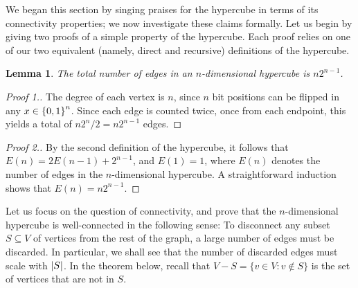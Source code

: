 \documentclass[11pt]{article}
\newcounter{thm}
\newtheorem{lemma}{Lemma}[thm]
\begin{document}
We began this section by singing praises for the hypercube in terms of its connectivity properties; we now investigate these claims formally. Let us begin by giving two proofs of a simple property of the hypercube. Each proof relies on one of our two equivalent (namely, direct and recursive) definitions of the hypercube.

\begin{lemma}
The total number of edges in an $n$-dimensional hypercube is $n 2^{n-1}$.
\end{lemma}
\begin{proof}[Proof 1.] The degree of each vertex is $n$, since $n$ bit positions can be flipped in any $x\in{\left\{0,1\right\}}^n$. Since each edge is counted twice, once from each endpoint, this yields a total of $n 2^n /2 = n2^{n-1}$ edges.
\end{proof}
\begin{proof}[Proof 2.]
By the second definition of the hypercube, it follows that $E(n) = 2E(n-1) + 2^{n-1}$, and $E(1) = 1$, where $E(n)$ denotes the number of edges in the $n$-dimensional hypercube. A straightforward induction shows that $E(n) = n 2^{n-1}$.
\end{proof}


Let us focus on the question of connectivity, and prove that the $n$-dimensional hypercube is well-connected in the following sense: To disconnect any subset $S\subseteq V$ of vertices from the rest of the graph, a large number of edges must be discarded. In particular, we shall see that the number of discarded edges must scale with $\left\lvert S \right\rvert$. In the theorem below, recall that $V - S = \{v \in V \colon v \notin S\}$ is the set of vertices that are not in $S$.
\end{document}
